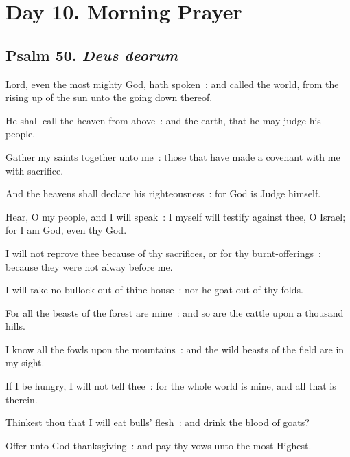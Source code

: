 \section*{Day 10. Morning Prayer}

\subsection{Psalm 50. \textit{Deus deorum}}


 Lord, even the most mighty God, hath spoken~: and called the world, from the rising up of the sun unto the going down thereof.\par
{}
He shall call the heaven from above~: and the earth, that he may judge his people.\par
{}Gather my saints together unto me~: those that have made a covenant with me with sacrifice.\par
{}And the heavens shall declare his righteousness~: for God is Judge himself.\par
{}Hear, O my people, and I will speak~: I myself will testify against thee, O Israel; for I am God, even thy God.\par
{}I will not reprove thee because of thy sacrifices, or for thy burnt-offerings~: because they were not alway before me.\par
{}I will take no bullock out of thine house~: nor he-goat out of thy folds.\par
{}For all the beasts of the forest are mine~: and so are the cattle upon a thousand hills.\par
{}I know all the fowls upon the mountains~: and the wild beasts of the field are in my sight.\par
{}If I be hungry, I will not tell thee~: for the whole world is mine, and all that is therein.\par
{}Thinkest thou that I will eat bulls' flesh~: and drink the blood of goats?\par
{}Offer unto God thanksgiving~: and pay thy vows unto the most Highest.\par
